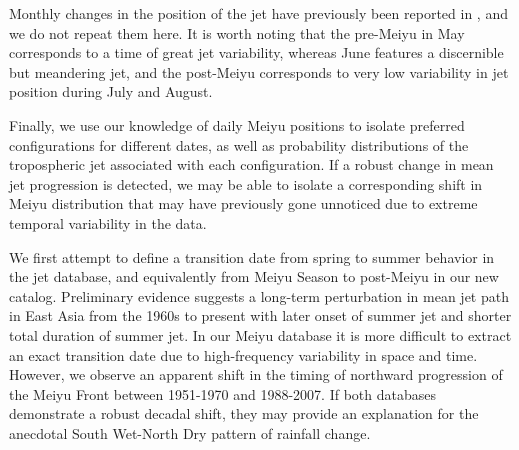 \documentclass[draft,grl]{AGUTeX}
\begin{document}
\begin{article}
	Monthly changes in the position of the jet have previously been reported in \citet{Schiemann2009}, and we do not repeat them here. It is worth noting that the pre-Meiyu in May corresponds to a time of great jet variability, whereas June features a discernible but meandering jet, and the post-Meiyu corresponds to very low variability in jet position during July and August.
	
		Finally, we use our knowledge of daily Meiyu positions to isolate preferred configurations for different dates, as well as probability distributions of the tropospheric jet associated with each configuration. If a robust change in mean jet progression is detected, we may be able to isolate a corresponding shift in Meiyu distribution that may have previously gone unnoticed due to extreme temporal variability in the data.
		
			We first attempt to define a transition date from spring to summer behavior in the jet database, and equivalently from Meiyu Season to post-Meiyu in our new catalog. Preliminary evidence suggests a long-term perturbation in mean jet path in East Asia from the 1960s to present with later onset of summer jet and shorter total duration of summer jet. In our Meiyu database it is more difficult to extract an exact transition date due to high-frequency variability in space and time. However, we observe an apparent shift in the timing of northward progression of the Meiyu Front between 1951-1970 and 1988-2007. If both databases demonstrate a robust decadal shift, they may provide an explanation for the anecdotal South Wet-North Dry pattern of rainfall change.


	





	

\end{article}
\end{document}
